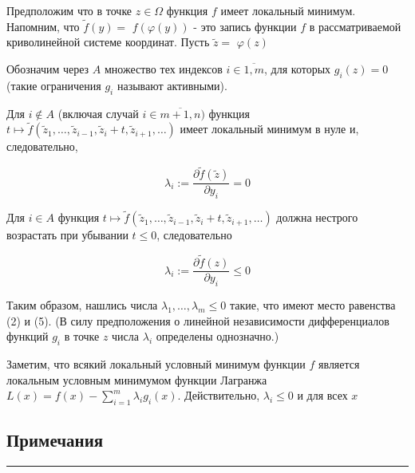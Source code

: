 \documentclass[a4paper,12pt]{article} %
\newcommand{\HRule}{\rule{\linewidth}{0.5mm}}
\begin{document}
Предположим что в точке $z \in \Omega$ функция $f$ имеет локальный минимум. Напомним, что $\tilde{f}(y)=$ $f(\varphi(y))$ - это запись функции $f$ в рассматриваемой криволинейной системе координат. Пусть $\tilde{z}=$ $\varphi(z)$

Обозначим через $A$ множество тех индексов $i \in \overline{1, m}$, для которых $g_{i}(z)=0$ (такие ограничения $g_{i}$ называют активными).

Для $i \notin A$ (включая случай $i \in \overline{m+1, n})$ функция $t \mapsto \tilde{f}\left(\tilde{z}_{1}, \ldots, \tilde{z}_{i-1}, \tilde{z}_{i}+t, \tilde{z}_{i+1}, \ldots\right)$ имеет локальный минимум в нуле и, следовательно,

$$
\lambda_{i}:=\frac{\partial \tilde{f}(\tilde{z})}{\partial y_{i}}=0
$$

Для $i \in A$ функция $t \mapsto \tilde{f}\left(\tilde{z}_{1}, \ldots, \tilde{z}_{i-1}, \tilde{z}_{i}+t, \tilde{z}_{i+1}, \ldots\right)$ должна нестрого возрастать при убывании $t \leq 0$, следовательно

$$
\lambda_{i}:=\frac{\partial \tilde{f}(z)}{\partial y_{i}} \leq 0
$$

Таким образом, нашлись числа $\lambda_{1}, \ldots, \lambda_{m} \leq 0$ такие, что имеют место равенства (2) и (5). (В силу предположения о линейной независимости дифференциалов функций $g_{i}$ в точке $z$ числа $\lambda_{i}$ определены однозначно.)

Заметим, что всякий локальный условный минимум функции $f$ является локальным условным минимумом функции Лагранжа $L(x)=f(x)-\sum_{i=1}^{m} \lambda_{i} g_{i}(x)$. Действительно, $\lambda_{i} \leq 0$ и для всех $x$



\newpage
\begin{LARGE}
\begin{center}
	\section{Примечания}
\end{center}
\end{LARGE}
\HRule \\
\end{document}
